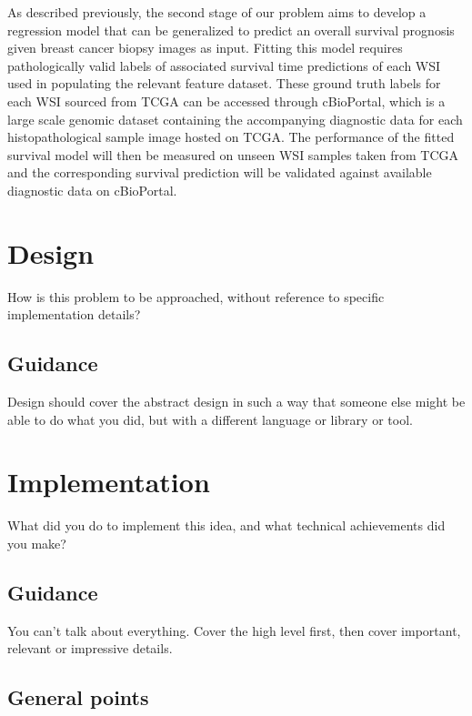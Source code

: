 \documentclass{l4proj}
\begin{document}
As described previously, the second stage of our problem aims to develop a regression model that can be generalized to predict an overall survival prognosis given breast cancer biopsy images as input. Fitting this model requires pathologically valid labels of associated survival time predictions of each WSI used in populating the relevant feature dataset. These ground truth labels for each WSI sourced from TCGA can be accessed through cBioPortal, which is a large scale genomic dataset containing the accompanying diagnostic data for each histopathological sample image hosted on TCGA. The performance of the fitted survival model will then be measured on unseen WSI samples taken from TCGA and the corresponding survival prediction will be validated against available diagnostic data on cBioPortal. 

\chapter{Design}
How is this problem to be approached, without reference to specific implementation details? 
\section{Guidance}
Design should cover the abstract design in such a way that someone else might be able to do what you did, but with a different language or library or tool. 

\chapter{Implementation}
What did you do to implement this idea, and what technical achievements did you make?
\section{Guidance}
You can't talk about everything. Cover the high level first, then cover important, relevant or impressive details.



\section{General points}
\end{document}
